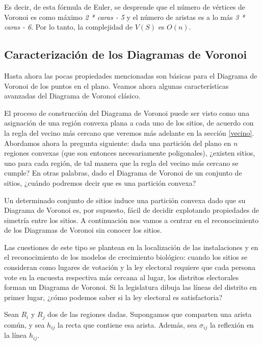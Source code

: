 Es decir, de esta fórmula de Euler, se desprende que el número de vértices de Voronoi es como máximo \textit{2 * caras - 5} y el número de aristas es a lo más \textit{3 * caras - 6}. Por lo tanto, la complejidad de $V(S)$ es $O(n)$.


\subsection{Caracterización de los Diagramas de Voronoi}

Hasta ahora las pocas propiedades mencionadas son básicas para el Diagrama de Voronoi de los puntos en el plano. Veamos ahora algunas características avanzadas del Diagrama de Voronoi clásico.
\vspace{0.3cm}

El proceso de construcción del Diagrama de Voronoi puede ser visto como una asignación de una región convexa plana a cada uno de los sitios, de acuerdo con la regla del vecino más cercano que veremos más adelante en la sección \ref{vecino}. Abordamos ahora la pregunta siguiente: dada una partición del plano en $n$ regiones convexas (que son entonces necesariamente poligonales), ¿existen sitios, uno para cada región, de tal manera que la regla del vecino más cercano se cumple? En otras palabras, dado el Diagrama de Voronoi de un conjunto de sitios, ¿cuándo podremos decir que es una partición convexa?
\vspace{0.3cm}

Un determinado conjunto de sitios induce una partición convexa dado que su Diagrama de Voronoi es, por supuesto, fácil de decidir explotando propiedades de simetría entre los sitios. A continuación nos vamos a centrar en el reconocimiento de los Diagramas de Voronoi sin conocer los sitios.
\vspace{0.3cm}

Las cuestiones de este tipo se plantean en la localización de las instalaciones y en el reconocimiento de los modelos de crecimiento biológico: cuando los sitios se consideran como lugares de votación y la ley electoral requiere que cada persona vote en la encuesta respectiva más cercana al lugar, los distritos electorales forman un Diagrama de Voronoi. Si la legislatura dibuja las líneas del distrito en primer lugar, ¿cómo podemos saber si la ley electoral es satisfactoria?
\vspace{0.3cm}

Sean $R_{i}$ y $R_{j}$ dos de las regiones dadas. Supongamos que comparten una arista común, y sea $h_{ij}$ la recta que contiene esa arista. Además, sea $\sigma_{ij}$ la reflexión en la línea $h_{ij}$.

